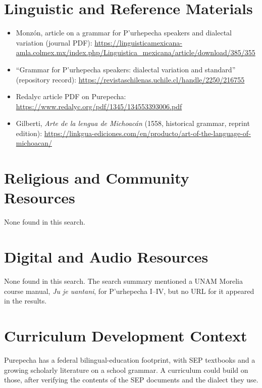 \documentclass[12pt]{article}
\begin{document}
\section{Linguistic and Reference Materials}
\begin{itemize}
\item Monz\'on, article on a grammar for P'urhepecha speakers and dialectal variation (journal PDF): \url{https://linguisticamexicana-amla.colmex.mx/index.php/Linguistica_mexicana/article/download/385/355}
\item ``Grammar for P'urhepecha speakers: dialectal variation and standard'' (repository record): \url{https://revistaschilenas.uchile.cl/handle/2250/216755}
\item Redalyc article PDF on Purepecha: \url{https://www.redalyc.org/pdf/1345/134553393006.pdf}
\item Gilberti, \emph{Arte de la lengua de Michoac\'an} (1558, historical grammar, reprint edition): \url{https://linkgua-ediciones.com/en/producto/art-of-the-language-of-michoacan/}
\end{itemize}

\section{Religious and Community Resources}
None found in this search.

\section{Digital and Audio Resources}
None found in this search. The search summary mentioned a UNAM Morelia course manual, \emph{Ju je uantani}, for P'urhepecha I--IV, but no URL for it appeared in the results.

\section{Curriculum Development Context}
Purepecha has a federal bilingual-education footprint, with SEP textbooks and a growing scholarly literature on a school grammar. A curriculum could build on those, after verifying the contents of the SEP documents and the dialect they use.
\end{document}
